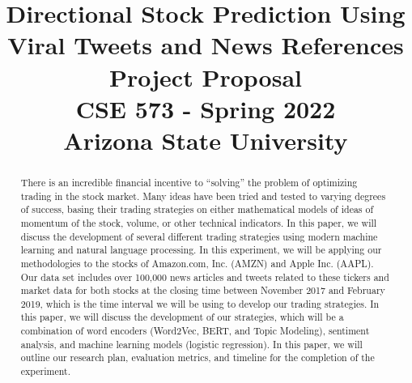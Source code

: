 \documentclass[conference]{IEEEtran}
\begin{document}
\title{%
  Directional Stock Prediction Using Viral Tweets and News References 
\\[.3in]
  \large Project Proposal \\
CSE 573 - Spring 2022 \\ 
Arizona State University \\
}


\author{
    \and
    \and
    \and
    \and

}




\maketitle

\begin{abstract}
    There is an incredible financial incentive to “solving” the problem of optimizing trading in the stock market. Many ideas have been tried and tested to varying degrees of success, basing their trading strategies on either mathematical models of ideas of momentum of the stock, volume, or other technical indicators. In this paper, we will discuss the development of several different trading strategies using modern machine learning and natural language processing. In this experiment, we will be applying our methodologies to the stocks of Amazon.com, Inc. (AMZN) and Apple Inc. (AAPL). Our data set includes over 100,000 news articles and tweets related to these tickers and market data for both stocks at the closing time between November 2017 and February 2019, which is the time interval we will be using to develop our trading strategies. In this paper, we will discuss the development of our strategies, which will be a combination of word encoders (Word2Vec, BERT, and Topic Modeling), sentiment analysis, and machine learning models (logistic regression). In this paper, we will outline our research plan, evaluation metrics, and timeline for the completion of the experiment.
\end{abstract}
\end{document}
